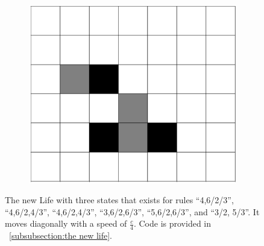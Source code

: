 \documentclass[12pt]{article}
\numberwithin{figure}{section} %
\begin{document}
\begin{figure}[H]
        \begin{subfigure}{0.18\textwidth}
     		\centering
     		\includegraphics[width=\linewidth]{Section4/30.4}
     		\subcaption{}
   	\end{subfigure}
   	\caption[The new Life]{The new Life with three states that exists for rules “4,6/2/3”, “4,6/2,4/3”, “4,6/2,4/3”, “3,6/2,6/3”, “5,6/2,6/3”, and “3/2, 5/3”. It moves diagonally with a speed of $\frac{c}{4}$. Code is provided in ~\ref{subsubsection:the new life}.}
   	\label{fig:the new life}
      	\vspace{-1.5em}
\end{figure}
\end{document}
